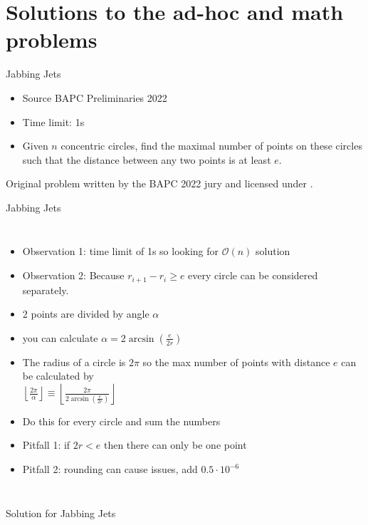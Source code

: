 \documentclass[11pt,pdf, aspectratio=169]{beamer}
\begin{document}
  \section{Solutions to the ad-hoc and math problems}
  \begin{frame}{Jabbing Jets}
    \begin{itemize}
      \item Source BAPC Preliminaries 2022
      \item Time limit: 1s
      \item Given $n$ concentric circles, find the maximal number of points on these circles such that the distance between any two points is at least $e$.
    \end{itemize}
    Original problem written by the BAPC 2022 jury and licensed under \doclicenseLongNameRef.

    \doclicenseImage

  \end{frame}
  \begin{frame}{Jabbing Jets}
    \begin{columns}
      \begin{itemize}
        \item Observation 1: time limit of 1s so looking for $\mathcal{O}(n)$ solution
        \item Observation 2: Because $r_{i+1}-r_i \geq e$ every circle can be considered separately.
        \item 2 points are divided by angle $\alpha$
        \item you can calculate $\alpha = 2 \arcsin{}(\frac{e}{2r})$
        \item The radius of a circle is $2\pi$ so the max number of points with distance $e$ can be calculated by\\
        $\left\lfloor\frac{2\pi}{\alpha}\right\rfloor \equiv \left\lfloor \frac{2\pi}{2 \arcsin{}(\frac{e}{2r})}\right\rfloor$
        \item Do this for every circle and sum the numbers
        \item Pitfall 1: if $2r < e$ then there can only be one point
        \item Pitfall 2: rounding can cause issues, add $0.5\cdot 10^{-6}$
      \end{itemize}
      
    \end{columns}
  \end{frame}
  \begin{frame}[containsverbatim]{Solution for Jabbing Jets}
    \inputminted{python}{code/session-1/python/dapc-j.py}
  \end{frame}
\end{document}
